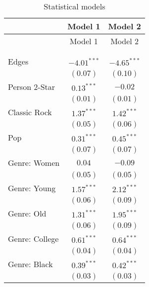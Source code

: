 
\begin{center}
\begin{longtable}{l c c}
\toprule
 & Model 1 & Model 2 \\
\midrule
\endfirsthead
\toprule
 & Model 1 & Model 2 \\
\midrule
\endhead
\bottomrule
\endfoot
\bottomrule
\multicolumn{3}{l}{\scriptsize{$^{***}p<0.001$; $^{**}p<0.01$; $^{*}p<0.05$}}\\
\caption{Statistical models}
\label{table:coefficients}
\endlastfoot \\
Edges                                  & $-4.01^{***}$ & $-4.65^{***}$ \\
                                       & $(0.07)$      & $(0.10)$      \\
Person 2-Star                          & $0.13^{***}$  & $-0.02$       \\
                                       & $(0.01)$      & $(0.01)$      \\
Classic Rock                           & $1.37^{***}$  & $1.42^{***}$  \\
                                       & $(0.05)$      & $(0.06)$      \\
Pop                                    & $0.31^{***}$  & $0.45^{***}$  \\
                                       & $(0.07)$      & $(0.07)$      \\
Genre: Women                           & $0.04$        & $-0.09$       \\
                                       & $(0.05)$      & $(0.05)$      \\
Genre: Young                           & $1.57^{***}$  & $2.12^{***}$  \\
                                       & $(0.06)$      & $(0.09)$      \\
Genre: Old                             & $1.31^{***}$  & $1.95^{***}$  \\
                                       & $(0.06)$      & $(0.09)$      \\
Genre: College                         & $0.61^{***}$  & $0.64^{***}$  \\
                                       & $(0.04)$      & $(0.04)$      \\
Genre: Black                           & $0.39^{***}$  & $0.42^{***}$  \\
                                       & $(0.03)$      & $(0.03)$      \\

\end{longtable}
\end{center}
